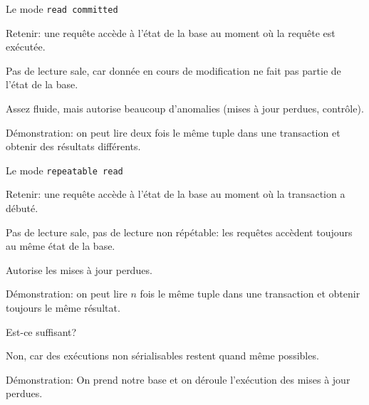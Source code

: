 \begin{frame}{Le mode \texttt{read committed}}

\alert{Retenir}: une requête accède à l'état de la base \alert{au moment où la
requête est exécutée}.

\vfill

Pas de lecture sale, car donnée en cours de modification ne fait pas partie de l'état de la base.

\vfill

Assez fluide, mais autorise beaucoup d'anomalies (mises à jour perdues, contrôle).
 
\vfill


\begin{blocgauche}
\alert{Démonstration}: on peut lire deux fois le même tuple dans une transaction et obtenir
des résultats différents.
\end{blocgauche}


\end{frame}


\begin{frame}{Le mode \texttt{repeatable read}}

\alert{Retenir}: une requête accède à l'état de la base \alert{au moment où la
transaction a débuté}.

\vfill

Pas de lecture sale, pas de lecture non répétable: les requêtes accèdent toujours
au même état de la base. 

\vfill

Autorise les mises à jour perdues.
 
\vfill



\begin{blocgauche}
\alert{Démonstration}: on peut lire $n$ fois le même tuple dans une transaction et obtenir
toujours le même résultat.
\end{blocgauche}


\end{frame}


\begin{frame}{Est-ce suffisant?}

\alert{Non}, car des exécutions non sérialisables restent quand même possibles.


\vfill


\alert{Démonstration}: On prend notre base et on déroule l'exécution des mises à jour perdues.

\end{frame}



